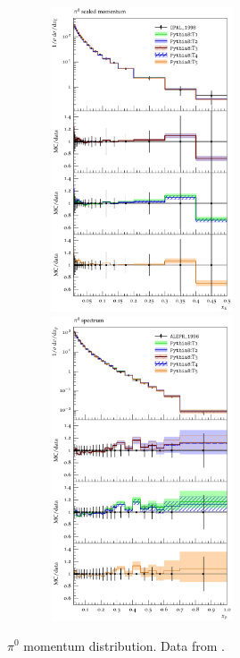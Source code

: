 \documentclass[aps,preprint,floatfix,nofootinbib,showpacs]{revtex4-1}
\begin{document}
   \begin{figure}[btp]
 \centering
 \includegraphics[width=8cm, height=9cm]{OPAL_1998/d04-x01-y01.pdf}
 \hfill
  \includegraphics[width=8cm, height=9cm]{ALEPH_1996/d29-x01-y01.pdf}
  \caption{$\pi^0$ momentum distribution. Data from \cite{Barate:1996fi, Ackerstaff:1998ap}.}
  \label{Fig-7}
 \end{figure}
\end{document}
